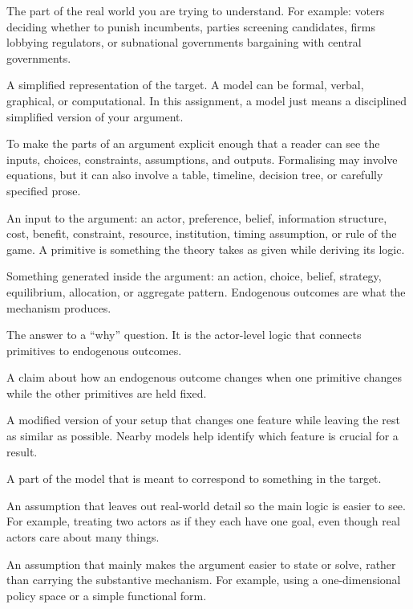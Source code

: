 \documentclass[12pt]{article}
\begin{document}
\begin{description}[leftmargin=2.8cm, style=nextline]
\item[Target] The part of the real world you are trying to understand. For example: voters deciding whether to punish incumbents, parties screening candidates, firms lobbying regulators, or subnational governments bargaining with central governments.
\item[Model] A simplified representation of the target. A model can be formal, verbal, graphical, or computational. In this assignment, a model just means a disciplined simplified version of your argument.
\item[Formalise] To make the parts of an argument explicit enough that a reader can see the inputs, choices, constraints, assumptions, and outputs. Formalising may involve equations, but it can also involve a table, timeline, decision tree, or carefully specified prose.
\item[Primitive] An input to the argument: an actor, preference, belief, information structure, cost, benefit, constraint, resource, institution, timing assumption, or rule of the game. A primitive is something the theory takes as given while deriving its logic.
\item[Endogenous outcome] Something generated inside the argument: an action, choice, belief, strategy, equilibrium, allocation, or aggregate pattern. Endogenous outcomes are what the mechanism produces.
\item[Mechanism] The answer to a ``why'' question. It is the actor-level logic that connects primitives to endogenous outcomes.
\item[Comparative static] A claim about how an endogenous outcome changes when one primitive changes while the other primitives are held fixed.
\item[Nearby model] A modified version of your setup that changes one feature while leaving the rest as similar as possible. Nearby models help identify which feature is crucial for a result.
\item[Representational feature] A part of the model that is meant to correspond to something in the target.
\item[Simplifying assumption] An assumption that leaves out real-world detail so the main logic is easier to see. For example, treating two actors as if they each have one goal, even though real actors care about many things.
\item[Technical assumption] An assumption that mainly makes the argument easier to state or solve, rather than carrying the substantive mechanism. For example, using a one-dimensional policy space or a simple functional form.
\end{description}
\end{document}
